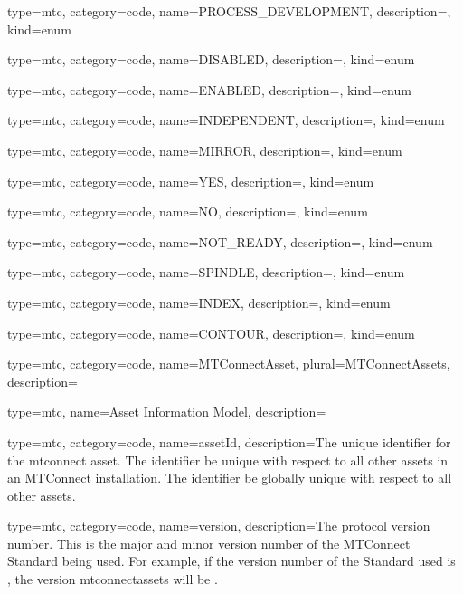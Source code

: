 {
  type=mtc,
  category=code,
  name={PROCESS\_DEVELOPMENT},
  description={},
  kind={enum}
}


{
  type=mtc,
  category=code,
  name={DISABLED},
  description={},
  kind={enum}
}


{
  type=mtc,
  category=code,
  name={ENABLED},
  description={},
  kind={enum}
}


{
  type=mtc,
  category=code,
  name={INDEPENDENT},
  description={},
  kind={enum}
}


{
  type=mtc,
  category=code,
  name={MIRROR},
  description={},
  kind={enum}
}


{
  type=mtc,
  category=code,
  name={YES},
  description={},
  kind={enum}
}


{
  type=mtc,
  category=code,
  name={NO},
  description={},
  kind={enum}
}


{
  type=mtc,
  category=code,
  name={NOT\_READY},
  description={},
  kind={enum}
}


{
  type=mtc,
  category=code,
  name={SPINDLE},
  description={},
  kind={enum}
}


{
  type=mtc,
  category=code,
  name={INDEX},
  description={},
  kind={enum}
}


{
  type=mtc,
  category=code,
  name={CONTOUR},
  description={},
  kind={enum}
}


{
  type=mtc,
  category=code,
  name={MTConnectAsset},
  plural={MTConnectAssets},
  description={}
}


{
  type=mtc,
  name={Asset Information Model},
  description={}
}


{
  type=mtc,
  category=code,
  name={assetId},
  description={The unique identifier for the \gls{mtconnect asset}. The identifier \MUST be unique with respect to all other \glspl{asset} in an MTConnect installation. The identifier \SHOULD be globally unique with respect to all other \glspl{asset}.}
}


{
  type=mtc,
  category=code,
  name={version},
  description={The protocol version number. This is the \gls{major} and \gls{minor} version number of the MTConnect Standard being used. For example, if the version number of the Standard used is , the \gls{version mtconnectassets} will be .}
}


